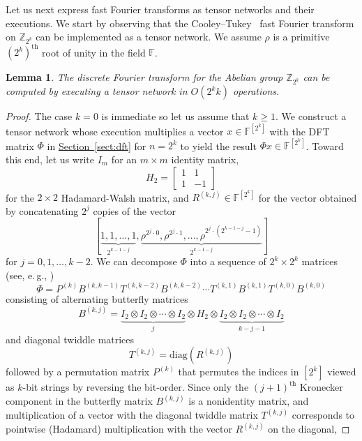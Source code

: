 \documentclass[11pt]{article}
\numberwithin{equation}{section}
\newtheorem{lemma}[theorem]{Lemma}
\theoremstyle{definition}
\theoremstyle{plain}
\newcommand{\Z}{\mathbb Z}
\newcommand{\eg}{e.\,g.}
\newcommand{\expref}[2]{\hyperref[#2]{#1~\ref{#2}}}
\newcommand{\F}{\ensuremath{\mathbb{F}}}
\begin{document}
Let us next express fast Fourier transforms as tensor networks and their
executions.
We start by observing that the Cooley--Tukey~\cite{CooleyT1965} fast
Fourier transform on $\Z_{2^k}$ can be implemented as a tensor network.
We assume $\rho$ is a primitive $(2^k)^\text{th}$ root of unity in
the field $\F$.

\begin{lemma}
\label{lem:fft}
The discrete Fourier transform for the Abelian group $\Z_{2^k}$ can
be computed by executing a tensor network in $O(2^kk)$ operations.
\end{lemma}
\begin{proof}
The case $k=0$ is immediate so let us assume that $k\geq 1$.
We construct a tensor
network whose execution multiplies a vector $x\in\F^{[2^k]}$ with the DFT
matrix $\Phi$ in \expref{Section}{sect:dft} for $n=2^k$
to yield the result $\Phi x\in\F^{[2^k]}$.
Toward this end, let us write $I_m$ for an
$m\times m$ identity matrix,
\begin{equation}
\label{eq:h2}
H_2=\left[\begin{array}{rr}1&1\\1&-1\end{array}\right]
\end{equation}
for the $2\times 2$ Hadamard-Walsh matrix, and
$R^{(k,j)}\in\F^{[2^k]}$ for the vector obtained by concatenating
$2^j$ copies of the vector
\[
[\underbrace{1,1,\ldots,1}_{2^{k-1-j}},
 \underbrace{\rho^{2^j\cdot 0},\rho^{2^j\cdot 1},\ldots,\rho^{2^j\cdot(2^{k-1-j}-1)}}_{2^{k-1-j}}]
\]
for $j=0,1,\ldots,k-2$.
%
%
We can decompose $\Phi$ into a sequence
of $2^k\times 2^k$ matrices 
(see, \eg, \cite{VanLoan1992})  %
\begin{equation}
\label{eq:cooley-tukey}
\Phi=P^{(k)}B^{(k,k-1)}T^{(k,k-2)}B^{(k,k-2)}\cdots T^{(k,1)}B^{(k,1)}T^{(k,0)}B^{(k,0)}
\end{equation}
consisting of alternating butterfly matrices
\[
B^{(k,j)}=
\underbrace{I_2\otimes I_2\otimes \cdots\otimes I_2}_{j}
\otimes H_2 \otimes
\underbrace{I_2\otimes I_2\otimes \cdots\otimes I_2}_{k-j-1}
\]
and diagonal twiddle matrices
\[
T^{(k,j)}=\text{diag}(R^{(k,j)})
\]
followed by a permutation matrix $P^{(k)}$ that permutes the indices
in $[2^k]$ viewed as $k$-bit strings by reversing the bit-order.
Since only the $(j+1)^\text{th}$ Kronecker component in the butterfly
matrix $B^{(k,j)}$ is a nonidentity matrix, and multiplication of
a vector with the diagonal twiddle matrix $T^{(k,j)}$
corresponds to pointwise (Hadamard) multiplication with the
vector $R^{(k,j)}$ on the diagonal,

\end{proof}
\end{document}
